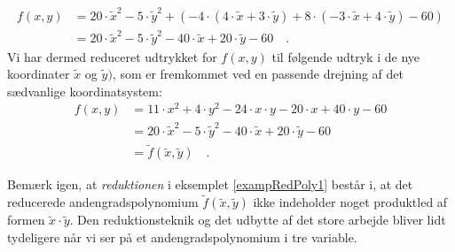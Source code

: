 \begin{example}
\begin{equation}
\begin{aligned}
f(x,y) &= 20\cdot \widetilde{x}^{2} - 5\cdot \widetilde{y}^{2} + (- 4\cdot(4\cdot \widetilde{x} + 3\cdot \widetilde{y})  + 8\cdot (-3\cdot \widetilde{x} + 4\cdot \widetilde{y}) - 60) \\
&= 20\cdot \widetilde{x}^{2} - 5\cdot \widetilde{y}^{2} - 40\cdot \widetilde{x} + 20\cdot \widetilde{y} - 60 \quad.
\end{aligned}
\end{equation}
Vi har dermed reduceret udtrykket for $f(x,y)$ til følgende udtryk i de nye koordinater $\widetilde{x}$ og  $\widetilde{y})$,  som er fremkommet ved en passende drejning af det sædvanlige koordinatsystem:
\begin{equation}
\begin{aligned}
f(x,y) &= 11\cdot x^{2} + 4\cdot y^{2} - 24\cdot x\cdot y - 20\cdot x + 40\cdot y - 60 \\
&=  20\cdot \widetilde{x}^{2} - 5\cdot \widetilde{y}^{2} - 40\cdot \widetilde{x} + 20\cdot \widetilde{y} - 60 \\
&= \widetilde{f}(\widetilde{x}, \widetilde{y}) \quad .
\end{aligned}
\end{equation}
\end{example}

\begin{aha}
Bemærk igen, at {\emph{reduktionen}} i eksemplet \ref{exampRedPoly1} består i, at det reducerede andengradspolynomium $\widetilde{f}(\widetilde{x}, \widetilde{y})$ ikke indeholder noget produktled af formen $\widetilde{x} \cdot \widetilde{y}$. Den reduktionsteknik og det udbytte af det store arbejde bliver lidt tydeligere når vi ser på et andengradspolynomium i tre variable.
\end{aha}


